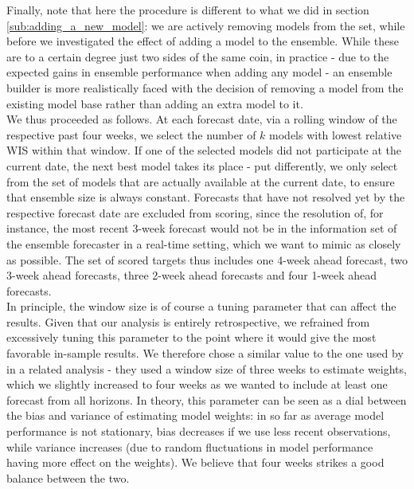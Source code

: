 Finally, note that here the procedure is different to what we did in section \ref{sub:adding_a_new_model}: we are actively removing models from the set, while before we investigated the effect of adding a model to the ensemble. While these are to a certain degree just two sides of the same coin, in practice - due to the expected gains in ensemble performance when adding any model - an ensemble builder is more realistically faced with the decision of removing a model from the existing model base rather than adding an extra model to it. \medskip \\
We thus proceeded as follows. At each forecast date, via a rolling window of the respective past four weeks, we select the number of $k$ models with lowest relative WIS within that window. If one of the selected models did not participate at the current date, the next best model takes its place - put differently, we only select from the set of models that are actually available at the current date, to ensure that ensemble size is always constant. Forecasts that have not resolved yet by the respective forecast date are excluded from scoring, since the resolution of, for instance, the most recent 3-week forecast would not be in the information set of the ensemble forecaster in a real-time setting, which we want to mimic as closely as possible. The set of scored targets thus includes one 4-week ahead forecast, two 3-week ahead forecasts, three 2-week ahead forecasts and four 1-week ahead forecasts.\\
In principle, the window size is of course a tuning parameter that can affect the results. Given that our analysis is entirely retrospective, we refrained from excessively tuning this parameter to the point where it would give the most favorable in-sample results. We therefore chose a similar value to the one used by \cite{bracher_evaluating_2021} in a related analysis - they used a window size of three weeks to estimate weights, which we slightly increased to four weeks as we wanted to include at least one forecast from all horizons. In theory, this parameter can be seen as a dial between the bias and variance of estimating model weights: in so far as average model performance is not stationary, bias decreases if we use less recent observations, while variance increases (due to random fluctuations in model performance having more effect on the weights). We believe that four weeks strikes a good balance between the two. \\%
